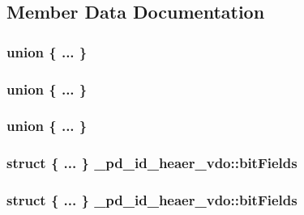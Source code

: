 \subsection{Member Data Documentation}
\hypertarget{struct__pd__id__heaer__vdo_a8270d36b24500eb331e6a975d58ec7ac}{\subsubsection[{"@10}]{\setlength{\rightskip}{0pt plus 5cm}union \{ ... \} }}\label{struct__pd__id__heaer__vdo_a8270d36b24500eb331e6a975d58ec7ac}
\hypertarget{struct__pd__id__heaer__vdo_aa869e4698640a5b0ad57d7795b18575d}{\subsubsection[{"@16}]{\setlength{\rightskip}{0pt plus 5cm}union \{ ... \} }}\label{struct__pd__id__heaer__vdo_aa869e4698640a5b0ad57d7795b18575d}
\hypertarget{struct__pd__id__heaer__vdo_afc0ed5013f79c4936e1504b303570552}{\subsubsection[{"@4}]{\setlength{\rightskip}{0pt plus 5cm}union \{ ... \} }}\label{struct__pd__id__heaer__vdo_afc0ed5013f79c4936e1504b303570552}
\hypertarget{struct__pd__id__heaer__vdo_abf5c2260b3c1b545ed4c11eb61444c24}{
\subsubsection[{bit\-Fields}]{\setlength{\rightskip}{0pt plus 5cm}struct \{ ... \}   \-\_\-pd\-\_\-id\-\_\-heaer\-\_\-vdo\-::bit\-Fields}}\label{struct__pd__id__heaer__vdo_abf5c2260b3c1b545ed4c11eb61444c24}
\hypertarget{struct__pd__id__heaer__vdo_aa8e2886698b5a02a2245c9a3fb667783}{
\subsubsection[{bit\-Fields}]{\setlength{\rightskip}{0pt plus 5cm}struct \{ ... \}   \-\_\-pd\-\_\-id\-\_\-heaer\-\_\-vdo\-::bit\-Fields}}\label{struct__pd__id__heaer__vdo_aa8e2886698b5a02a2245c9a3fb667783}
